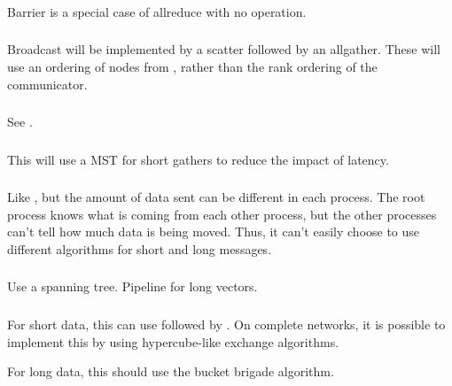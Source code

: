 \documentclass{article}
\begin{document}
\subsubsection{}
Barrier is a special case of allreduce with no operation.

\subsubsection{}
Broadcast will be implemented by a scatter followed by an allgather.  These
will use an ordering of nodes from , rather than
the rank ordering of the communicator.

\subsubsection{}
See .

\subsubsection{}
This will use a MST for short gathers to reduce the impact of latency.  

\subsubsection{}
Like , but the amount of data sent can be different in
each process.  The root process knows what is coming from each other process,
but the other processes can't tell how much data is being moved.  Thus, it
can't easily choose to use different algorithms for short and long messages.  

\subsubsection{}
Use a spanning tree.  Pipeline for long vectors.

\subsubsection{}
For short data, this can use  followed by
.  On 
complete networks, it is possible to implement this by using hypercube-like
exchange algorithms.

For long data, this should use the bucket brigade algorithm.
\end{document}
